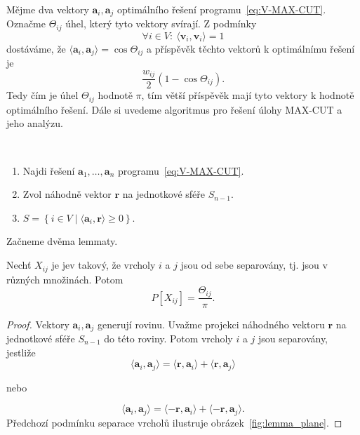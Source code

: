 Mějme dva vektory $\mathbf{a}_i, \mathbf{a}_j$ optimálního řešení programu~\ref{eq:V-MAX-CUT}. Označme $\Theta_{ij}$ úhel, který tyto vektory svírají. Z podmínky
$$
    \forall i \in V:\ \langle \mathbf{v}_i, \mathbf{v}_i \rangle = 1
$$
dostáváme, že $\langle \mathbf{a}_i, \mathbf{a}_j \rangle = \cos \Theta_{ij}$ a příspěvěk těchto vektorů k optimálnímu řešení je
$$
    \frac{w_{ij}}{2} (1 - \cos \Theta_{ij}).
$$
Tedy čím  je úhel $\Theta_{ij}$ hodnotě $\pi$, tím větší příspěvěk mají tyto vektory k hodnotě optimálního řešení. Dále si uvedeme algoritmus pro řešení úlohy MAX-CUT a jeho analýzu.

\begin{alg}$ $
    \begin{enumerate}
        \item Najdi řešení $\mathbf{a}_1, \dots, \mathbf{a}_n$ programu~\ref{eq:V-MAX-CUT}.
        \item Zvol náhodně vektor $\mathbf{r}$ na jednotkové sféře $S_{n-1}$.
        \item $S = \left\{ i \in V \mid \langle \mathbf{a}_i, \mathbf{r} \rangle \geq 0 \right\}$.
    \end{enumerate}
\end{alg}

Začneme dvěma lemmaty.

\begin{lm}
    Nechť $X_{ij}$ je jev takový, že vrcholy $i$ a $j$ jsou od sebe separovány, tj. jsou v různých množinách. Potom
    $$
        P\left[ X_{ij} \right] = \frac{\Theta_{ij}}{\pi}.
    $$
    \label{lemma:sep}
\end{lm}

\begin{proof}
    Vektory $\mathbf{a}_i, \mathbf{a}_j$ generují rovinu. Uvažme projekci náhodného vektoru $\mathbf{r}$ na jednotkové sféře $S_{n-1}$ do této roviny. Potom vrcholy $i$ a $j$ jsou separovány, jestliže
    $$
        \langle \mathbf{a}_i, \mathbf{a}_j \rangle = \langle \mathbf{r}, \mathbf{a}_i \rangle + \langle \mathbf{r}, \mathbf{a}_j \rangle
    $$
    \begin{center}
        nebo
    \end{center}
    $$
        \langle \mathbf{a}_i, \mathbf{a}_j \rangle = \langle \mathbf{-r}, \mathbf{a}_i \rangle + \langle \mathbf{-r}, \mathbf{a}_j \rangle.
    $$
    Předchozí podmínku separace vrcholů ilustruje obrázek~\ref{fig:lemma_plane}.
\end{proof}


